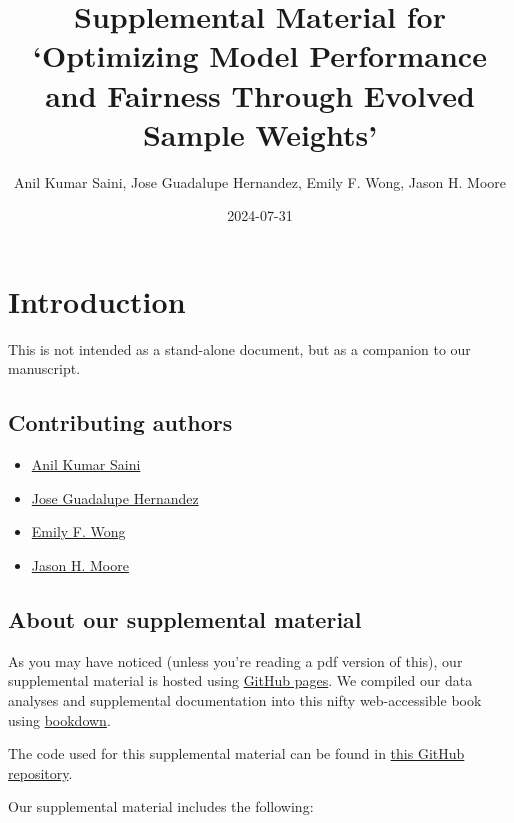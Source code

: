 \documentclass[
]{book}
\title{Supplemental Material for `Optimizing Model Performance and Fairness Through Evolved Sample Weights'}
\author{Anil Kumar Saini, Jose Guadalupe Hernandez, Emily F. Wong, Jason H. Moore}
\date{2024-07-31}
\providecommand{\tightlist}{%
  \setlength{\itemsep}{0pt}\setlength{\parskip}{0pt}}
\begin{document}
\maketitle

{
\setcounter{tocdepth}{1}
\tableofcontents
}
\hypertarget{introduction}{%
\chapter{Introduction}\label{introduction}}

This is not intended as a stand-alone document, but as a companion to our manuscript.

\hypertarget{contributing-authors}{%
\section{Contributing authors}\label{contributing-authors}}

\begin{itemize}
\tightlist
\item
  \href{https://theaksaini.github.io/}{Anil Kumar Saini}
\item
  \href{https://jgh9094.github.io/}{Jose Guadalupe Hernandez}
\item
  \href{https://www.cedars-sinai.edu/research-education/research/labs/bright/members.html}{Emily F. Wong}
\item
  \href{https://jasonhmoore.org/}{Jason H. Moore}
\end{itemize}

\hypertarget{about-our-supplemental-material}{%
\section{About our supplemental material}\label{about-our-supplemental-material}}

As you may have noticed (unless you're reading a pdf version of this), our supplemental material is hosted using \href{https://pages.github.com/}{GitHub pages}.
We compiled our data analyses and supplemental documentation into this nifty web-accessible book using \href{https://bookdown.org}{bookdown}.

The code used for this supplemental material can be found in \href{https://github.com/jgh9094/GPTP-2024-Lexicase-Analysis}{this GitHub repository}.

Our supplemental material includes the following:
\end{document}

